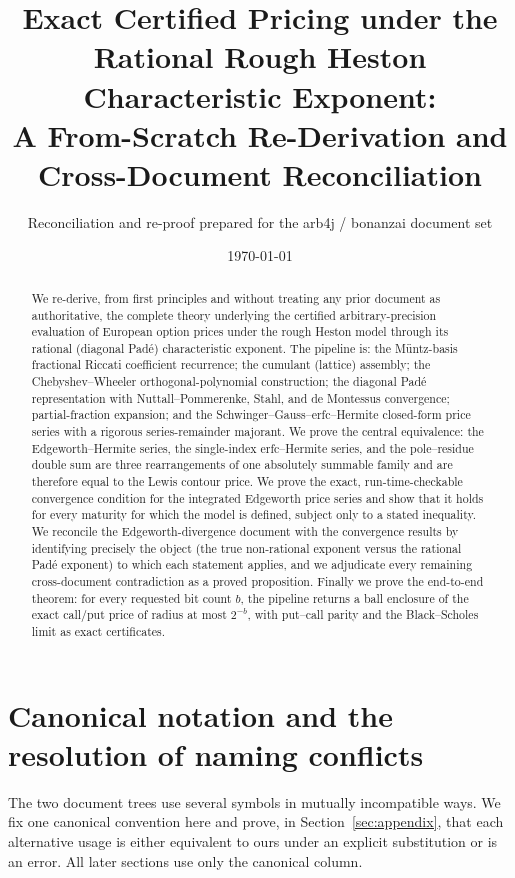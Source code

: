 \documentclass[11pt]{article}
\title{\bfseries Exact Certified Pricing under the Rational Rough Heston
Characteristic Exponent:\\ A From-Scratch Re-Derivation and Cross-Document
Reconciliation}
\author{Reconciliation and re-proof prepared for the arb4j / bonanzai document set}
\date{\today}
\theoremstyle{plain}
\theoremstyle{definition}
\theoremstyle{remark}
\begin{document}
\maketitle

\begin{abstract}
We re-derive, from first principles and without treating any prior document as
authoritative, the complete theory underlying the certified arbitrary-precision
evaluation of European option prices under the rough Heston model through its
rational (diagonal Padé) characteristic exponent. The pipeline is: the
Müntz-basis fractional Riccati coefficient recurrence; the cumulant (lattice)
assembly; the Chebyshev--Wheeler orthogonal-polynomial construction; the
diagonal Padé representation with Nuttall--Pommerenke, Stahl, and de Montessus
convergence; partial-fraction expansion; and the Schwinger--Gauss--erfc--Hermite
closed-form price series with a rigorous series-remainder majorant. We prove the
central equivalence: the Edgeworth--Hermite series, the single-index
erfc--Hermite series, and the pole--residue double sum are three rearrangements
of one absolutely summable family and are therefore equal to the Lewis contour
price. We prove the exact, run-time-checkable convergence condition for the
integrated Edgeworth price series and show that it holds for every maturity for
which the model is defined, subject only to a stated inequality. We reconcile
the Edgeworth-divergence document with the convergence results by identifying
precisely the object (the true non-rational exponent versus the rational Padé
exponent) to which each statement applies, and we adjudicate every remaining
cross-document contradiction as a proved proposition. Finally we prove the
end-to-end theorem: for every requested bit count $b$, the pipeline returns a
ball enclosure of the exact call/put price of radius at most $2^{-b}$, with put--call
parity and the Black--Scholes limit as exact certificates.
\end{abstract}

\tableofcontents

\section{Canonical notation and the resolution of naming conflicts}
\label{sec:notation}

The two document trees use several symbols in mutually incompatible ways. We fix
one canonical convention here and prove, in Section~\ref{sec:appendix}, that each
alternative usage is either equivalent to ours under an explicit substitution or
is an error. All later sections use only the canonical column.
\end{document}
